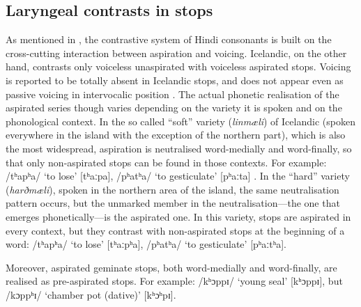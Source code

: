 \documentclass[11pt,a4paper,oneside,openany]{memoir}\usepackage[]{graphicx}\usepackage[]{color}
\begin{document}

\subsection{Laryngeal contrasts in stops}
As mentioned in , the contrastive system of Hindi consonants is built on the cross-cutting interaction between aspiration and voicing.
Icelandic, on the other hand, contrasts only voiceless unaspirated with voiceless aspirated stops.
Voicing is reported to be totally absent in Icelandic stops, and does not appear even as passive voicing in intervocalic position \citep{arnason2011}.
The actual phonetic realisation of the aspirated series though varies depending on the variety it is spoken and on the phonological context.
In the so called ``soft'' variety (\textit{linmæli}) of Icelandic (spoken everywhere in the island with the exception of the northern part), which is also the most widespread, aspiration is neutralised word-medially and word-finally, so that only non-aspirated stops can be found in those contexts.
For example: /tʰapʰa/ `to lose' [tʰaːpa], /pʰatʰa/ `to gesticulate' [pʰaːta] \citep[p. 104]{arnason2011}.
In the ``hard'' variety (\textit{harðmæli}), spoken in the northern area of the island, the same neutralisation pattern occurs, but the unmarked member in the neutralisation---the one that emerges phonetically---is the aspirated one.
In this variety, stops are aspirated in every context, but they contrast with non-aspirated stops at the beginning of a word: /tʰapʰa/ `to lose' [tʰaːpʰa], /pʰatʰa/ `to gesticulate' [pʰaːtʰa].

Moreover, aspirated geminate stops, both word-medially and word-finally, are realised as pre-aspirated stops.
For example: /kʰɔppɪ/ `young seal' [kʰɔppɪ], but /kɔppʰɪ/ `chamber pot (dative)' [kʰɔʰpɪ].
\end{document}
